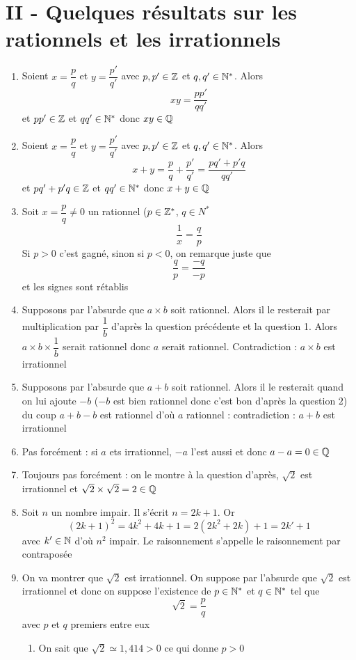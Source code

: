 \section*{II - Quelques résultats sur les rationnels et les irrationnels}
\begin{enumerate}
\item Soient $x = \dfrac{p}{q}$ et $y = \dfrac{p'}{q'}$ avec $p,p' \in \mathbb{Z}$ et $q,q' \in \mathbb{N}^*$. Alors $$xy = \dfrac{pp'}{qq'}$$ et $pp' \in \mathbb{Z}$ et $qq' \in \mathbb{N}^*$ donc $xy \in \mathbb{Q}$
\item Soient $x = \dfrac{p}{q}$ et $y = \dfrac{p'}{q'}$ avec $p,p' \in \mathbb{Z}$ et $q,q' \in \mathbb{N}^*$. Alors $$x+y = \dfrac{p}{q} + \dfrac{p'}{q'} = \dfrac{pq' + p'q}{qq'}$$ et $pq'+ p'q \in \mathbb{Z}$ et $qq' \in \mathbb{N}^*$ donc $x+y \in \mathbb{Q}$
\item Soit $x = \dfrac{p}{q} \neq 0$ un rationnel ($p \in \mathbb{Z}^*$, $q\in N^*$ $$\dfrac{1}{x} = \dfrac{q}{p}$$
Si $p > 0$ c'est gagné, sinon si $p<0$, on remarque juste que $$\dfrac{q}{p} = \dfrac{-q}{-p}$$ et les signes sont rétablis
\item Supposons par l'absurde que $a\times b$ soit rationnel. Alors il le resterait par multiplication par $\dfrac{1}{b}$ d'après la question précédente et la question 1. Alors $a\times b\times \dfrac{1}{b}$ serait rationnel donc $a$ serait rationnel. Contradiction : $a\times b$ est irrationnel
\item Supposons par l'absurde que $a+b$ soit rationnel. Alors il le resterait quand on lui ajoute $-b$ ($-b$ est bien rationnel donc c'est bon d'après la question $2$) du coup $a + b -b$ est rationnel d'où $a$ rationnel : contradiction : $a+b$ est irrationnel
\item Pas forcément : si $a$ ets irrationnel, $-a$ l'est aussi et donc $a-a = 0 \in \mathbb{Q}$
\item Toujours pas forcément : on le montre à la question d'après, $\sqrt{2}$ est irrationnel et $\sqrt{2} \times \sqrt{2} = 2 \in \mathbb{Q}$
\item Soit $n$ un nombre impair. Il s'écrit $n = 2k+1$. Or $$(2k+1)^2 = 4k^2 + 4k +1 = 2(2k^2+2k)+1 = 2k'+1$$ avec $k' \in \mathbb{N}$ d'où $n^2$ impair. Le raisonnement s'appelle le raisonnement par contraposée
\item On va montrer que $\sqrt{2}$ est irrationnel. On suppose par l'absurde que $\sqrt{2}$ est irrationnel et donc on suppose l'existence de $p \in \mathbb{N}^*$ et $q \in \mathbb{N}^*$ tel que $$\sqrt{2} = \dfrac{p}{q}$$ avec $p$ et $q$ premiers entre eux
\begin{enumerate}
\item On sait que $\sqrt{2} \simeq 1,414 > 0$ ce qui donne $p>0$

\end{enumerate}
\end{enumerate}
